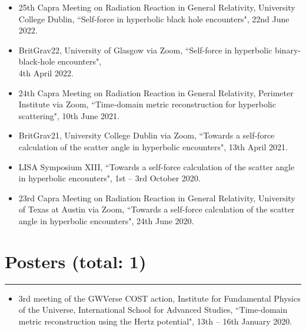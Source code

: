 \documentclass[10.5pt, oneside]{article}   	%
\begin{document}
\begin{itemize}
\item 25th Capra Meeting on Radiation Reaction in General Relativity, University College Dublin, ``Self-force in hyperbolic black hole encounters", 22nd June 2022. \href{https://oliverlong.info/talks/capra25}{}
\item BritGrav22, University of Glasgow via Zoom, ``Self-force in hyperbolic binary-black-hole encounters", \\ 4th April 2022. \href{https://www.youtube.com/watch?v=zZEblkjb5IM}{}
\item 24th Capra Meeting on Radiation Reaction in General Relativity, Perimeter Institute via Zoom, ``Time-domain metric reconstruction for hyperbolic scattering", 10th June 2021. \href{https://pirsa.org/21060058}{}
\item BritGrav21, University College Dublin via Zoom, ``Towards a self-force calculation of the scatter angle in hyperbolic encounters", 13th April 2021. \href{https://oliverlong.info/talks/britgrav21}{}
\item LISA Symposium XIII, ``Towards a self-force calculation of the scatter angle in hyperbolic encounters", 1st -- 3rd October 2020. \href{https://lisasymposium13.lisamission.org/presentations/i0xMnRFWi7WKbO5f01caGDH0zPK2/7qz7uYC3qHuzj9AsC49h}{}
\item 23rd Capra Meeting on Radiation Reaction in General Relativity, University of Texas at Austin via Zoom, ``Towards a self-force calculation of the scatter angle in hyperbolic encounters", 24th June 2020. \href{https://www.youtube.com/watch?v=HB-Rw5kRUfg&t=11311s}{}
\end{itemize} 
 
{\color{Sectioncolour}
\section*{Posters {\rm (total: 1)}}
\vspace{-3mm}
\noindent\rule{\linewidth}{0.6pt}}
\begin{itemize}
\item 3rd meeting of the GWVerse COST action, Institute for Fundamental Physics of the Universe, International School for Advanced Studies, ``Time-domain metric reconstruction using the Hertz potential", 13th -- 16th January 2020.
\end{itemize} 

\end{document}
